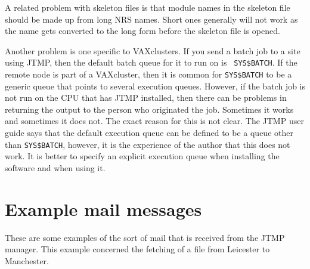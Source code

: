 A related problem with skeleton files is that module names in the skeleton file
should be made up from long NRS names. Short ones generally will not work as
the name gets converted to the long form before the skeleton file is opened.

Another problem is one specific to VAXclusters. If you send a batch job to a
site using JTMP, then the default batch queue for it to run on is {\tt
SYS\$BATCH}. If the remote node is part of a VAXcluster, then it is common for
{\tt SYS\$BATCH} to be a generic queue that points to several execution queues.
However, if the batch job is not run on the CPU that has JTMP installed, then
there can be problems in returning the output to the person who originated the
job. Sometimes it works and sometimes it does not. The exact reason for this is
not clear. The JTMP user guide says that the default execution queue can be
defined to be a queue other than {\tt SYS\$BATCH}, however, it is the
experience of the author that this does not work. It is better to specify an
explicit execution queue when installing the software and when using it.


\appendix
\section{Example mail messages}
\label{mail}

These are some examples of the sort of mail that is received from the JTMP
manager. This example concerned the fetching of a file from Leicester to
Manchester.

